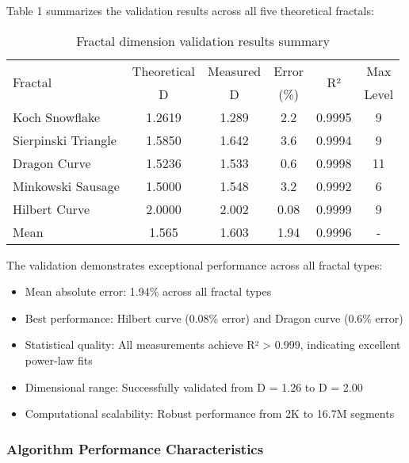\documentclass[preprint,12pt]{elsarticle}
\def\textbf#1{#1}%
\begin{document}
Table 1 summarizes the validation results across all five theoretical fractals:

\begin{table}[ht]
\centering
\footnotesize
\caption{Fractal dimension validation results summary}
\label{tab:validation_summary}
\begin{tabular}{|l|c|c|c|c|c|}
\hline
\multirow{2}{*}{\textbf{Fractal}} & \textbf{Theoretical} & \textbf{Measured} & \textbf{Error} & \multirow{2}{*}{\textbf{R²}} & \textbf{Max} \\
 & \textbf{D} & \textbf{D} & \textbf{(\%)} &  & \textbf{Level} \\
\hline
Koch Snowflake & 1.2619 & 1.289 & 2.2 & 0.9995 & 9 \\
Sierpinski Triangle & 1.5850 & 1.642 & 3.6 & 0.9994 & 9 \\
Dragon Curve & 1.5236 & 1.533 & 0.6 & 0.9998 & 11 \\
Minkowski Sausage & 1.5000 & 1.548 & 3.2 & 0.9992 & 6 \\
Hilbert Curve & 2.0000 & 2.002 & 0.08 & 0.9999 & 9 \\
\hline
\textbf{Mean} & \textbf{1.565} & \textbf{1.603} & \textbf{1.94} & \textbf{0.9996} & \textbf{-} \\
\hline
\end{tabular}
\end{table}

The validation demonstrates exceptional performance across all fractal types:

\begin{itemize}
\item \textbf{Mean absolute error}: 1.94\% across all fractal types
\item \textbf{Best performance}: Hilbert curve (0.08\% error) and Dragon curve (0.6\% error)
\item \textbf{Statistical quality}: All measurements achieve R² > 0.999, indicating excellent power-law fits
\item \textbf{Dimensional range}: Successfully validated from D = 1.26 to D = 2.00
\item \textbf{Computational scalability}: Robust performance from 2K to 16.7M segments
\end{itemize}

\subsubsection{Algorithm Performance Characteristics}
\end{document}
